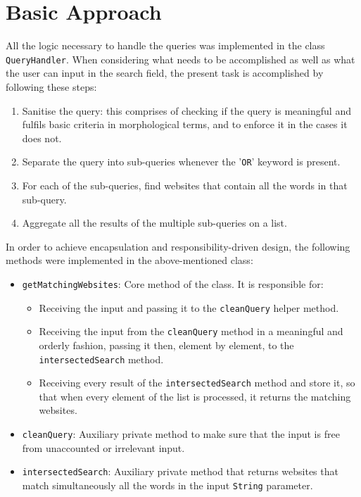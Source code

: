 \section{Basic Approach} %
All the logic necessary to handle the queries was implemented in the class {\tt QueryHandler}.
When considering what needs to be accomplished as well as what the user can input in the search field, the present task is accomplished by following these steps:
\begin{enumerate}
    \item Sanitise the query: this comprises of checking if the query is meaningful and fulfils basic criteria in morphological terms, and to enforce it in the cases it does not.
    \item Separate the query into sub-queries whenever the '{\tt OR}' keyword is present.
    \item For each of the sub-queries, find websites that contain all the words in that sub-query.
    \item Aggregate all the results of the multiple sub-queries on a list.
\end{enumerate}
In order to achieve encapsulation and responsibility-driven design, the following methods were implemented in the above-mentioned class:
\begin{itemize}
    \item {\tt getMatchingWebsites}: Core method of the class. It is responsible for:
    \begin{itemize}
        \item Receiving the input and passing it to the {\tt cleanQuery} helper method.
        \item Receiving the input from the {\tt cleanQuery} method in a meaningful and orderly fashion, passing it then, element by element, to the {\tt intersectedSearch} method.
        \item Receiving every result of the {\tt intersectedSearch} method and store it, so that when every element of the list is processed, it returns the matching websites.
    \end{itemize}
    \item {\tt cleanQuery}: Auxiliary private method to make sure that the input is free from unaccounted or irrelevant input.
    \item {\tt intersectedSearch}: Auxiliary private method that returns websites that match simultaneously all the words in the input {\tt String} parameter.
\end{itemize}

